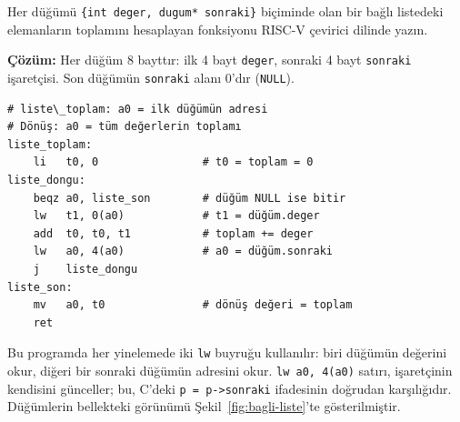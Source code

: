 \begin{ornek}[4.13]
\label{orn:bagli-liste}
Her düğümü \texttt{\{int deger, dugum* sonraki\}} biçiminde olan bir bağlı listedeki elemanların toplamını hesaplayan fonksiyonu RISC-V çevirici dilinde yazın.

\textbf{Çözüm:} Her düğüm 8 bayttır: ilk 4 bayt \texttt{deger}, sonraki 4 bayt \texttt{sonraki} işaretçisi. Son düğümün \texttt{sonraki} alanı 0'dır (\texttt{NULL}).

\begin{lstlisting}[style=riscv]
# liste\_toplam: a0 = ilk düğümün adresi
# Dönüş: a0 = tüm değerlerin toplamı
liste_toplam:
    li   t0, 0                # t0 = toplam = 0
liste_dongu:
    beqz a0, liste_son        # düğüm NULL ise bitir
    lw   t1, 0(a0)            # t1 = düğüm.deger
    add  t0, t0, t1           # toplam += deger
    lw   a0, 4(a0)            # a0 = düğüm.sonraki
    j    liste_dongu
liste_son:
    mv   a0, t0               # dönüş değeri = toplam
    ret
\end{lstlisting}

Bu programda her yinelemede iki \texttt{lw} buyruğu kullanılır: biri düğümün değerini okur, diğeri bir sonraki düğümün adresini okur. \texttt{lw a0, 4(a0)} satırı, işaretçinin kendisini günceller; bu, C'deki \texttt{p = p->sonraki} ifadesinin doğrudan karşılığıdır. Düğümlerin bellekteki görünümü Şekil~\ref{fig:bagli-liste}'te gösterilmiştir.
\end{ornek}

